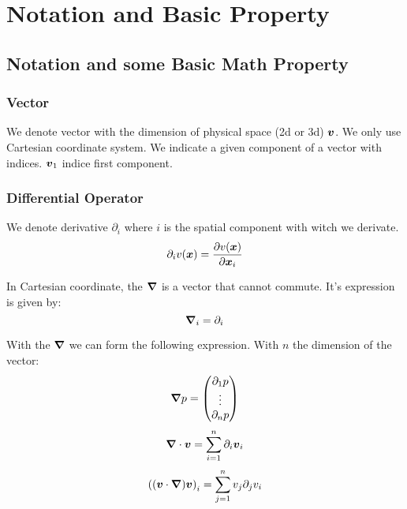 \chapter{Notation and Basic Property}
\minitoc

\section{Notation and some Basic Math Property}

\subsection{Vector}

We denote vector with the dimension of physical space (2d or 3d) ${\boldsymbol {v}}$.
We only use Cartesian coordinate system.
We indicate a given component of a vector with indices. ${\boldsymbol {v}}_1$ indice first component.

\subsection{Differential Operator}

We denote derivative  $\partial_i$ where $i$ is the spatial component with witch we derivate.
\begin{equation}
 \partial_i v({\boldsymbol {x}})=\frac{\partial v({\boldsymbol {x}})}{\partial {\boldsymbol {x}}_{i}}
\end{equation}

\begin{definition}[Nabla]
 In Cartesian coordinate, the ${\boldsymbol {\nabla}}$ is a vector that cannot commute.
 It's expression is given by:
 \begin{equation}
 {\boldsymbol {\nabla}}_{i}=\partial_{i}
 \end{equation}
\end{definition}

With the ${\boldsymbol {\nabla}}$ we can form the following expression.
With $n$ the dimension of the vector:
\begin{equation}
 {\boldsymbol {\nabla}}p=\begin{pmatrix}\partial_1 p\\ \vdots \\ \partial_n p\end{pmatrix}
\end{equation}
\begin{equation}
 {\boldsymbol {\nabla}}\cdot {\boldsymbol {v}}=\sum_{i=1}^{n}\partial_i {\boldsymbol {v}}_i
\end{equation}
\begin{equation}
 \left(({\boldsymbol {v}}\cdot{\boldsymbol {\nabla}}){\boldsymbol {v}}\right)_{i}=\sum_{j=1}^{n}v_{j}\partial_{j} v_{i}
\end{equation}


